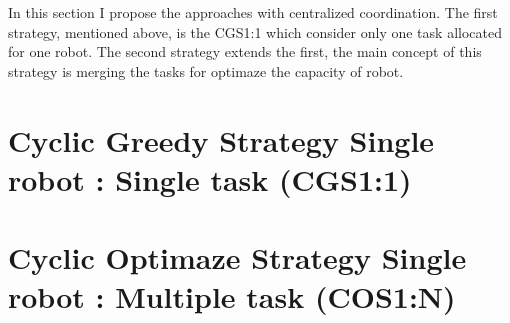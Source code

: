 In this section I propose the approaches with centralized coordination.
The first strategy, mentioned above, is the CGS1:1 which consider only 
one task allocated for one robot.
The second strategy extends the first, the main concept of this strategy 
is merging the tasks for optimaze the capacity of robot.

\section{Cyclic Greedy Strategy Single robot : Single task (CGS1:1)}





\section{Cyclic Optimaze Strategy Single robot : Multiple task (COS1:N)}


